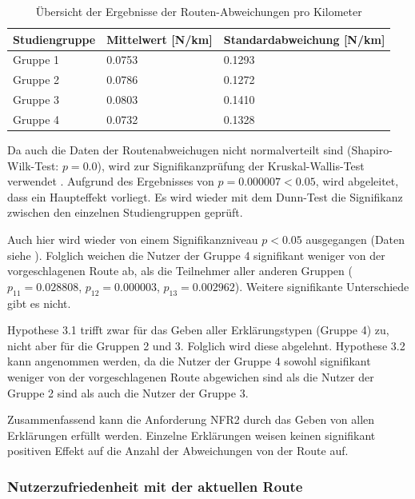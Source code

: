 \begin{table}[htb!]
    \centering
    \begin{tabular}{p{}p{}p{}}
        \hline
        Studiengruppe  & Mittelwert [N/km] & Standardabweichung [N/km]\\
        \toprule
        Gruppe 1                & 0.0753 & 0.1293 \\
        Gruppe 2                & 0.0786 & 0.1272 \\
        Gruppe 3                & 0.0803 & 0.1410 \\
        Gruppe 4                & 0.0732 & 0.1328 \\
        \bottomrule
    \end{tabular}
    \caption{Übersicht der Ergebnisse der Routen-Abweichungen pro Kilometer}
    \label{tab:study_offroute_results}
\end{table}

Da auch die Daten der Routenabweichugen nicht normalverteilt sind (Shapiro-Wilk-Test: $ p = 0.0 $), wird zur Signifikanzprüfung der Kruskal-Wallis-Test verwendet \cite{wohlin2012experimentation}. Aufgrund des Ergebnisses von $ p = 0.000007 < 0.05 $, wird abgeleitet, dass ein Haupteffekt vorliegt. Es wird wieder mit dem Dunn-Test die Signifikanz zwischen den einzelnen Studiengruppen geprüft. 

Auch hier wird wieder von einem Signifikanzniveau $ p < 0.05 $ ausgegangen (Daten siehe ). Folglich weichen die Nutzer der Gruppe 4 signifikant weniger von der vorgeschlagenen Route ab, als die Teilnehmer aller anderen Gruppen ($ p_{11} = 0.028808 $, $ p_{12} = 0.000003 $, $ p_{13} = 0.002962 $). Weitere signifikante Unterschiede gibt es nicht.

Hypothese 3.1 trifft zwar für das Geben aller Erklärungstypen (Gruppe 4) zu, nicht aber für die Gruppen 2 und 3. Folglich wird diese abgelehnt. Hypothese 3.2 kann angenommen werden, da die Nutzer der Gruppe 4 sowohl signifikant weniger von der vorgeschlagenen Route abgewichen sind als die Nutzer der Gruppe 2 sind als auch die Nutzer der Gruppe 3.

Zusammenfassend kann die Anforderung NFR2 durch das Geben von allen Erklärungen erfüllt werden. Einzelne Erklärungen weisen keinen signifikant positiven Effekt auf die Anzahl der Abweichungen von der Route auf. 

\subsubsection{Nutzerzufriedenheit mit der aktuellen Route}

